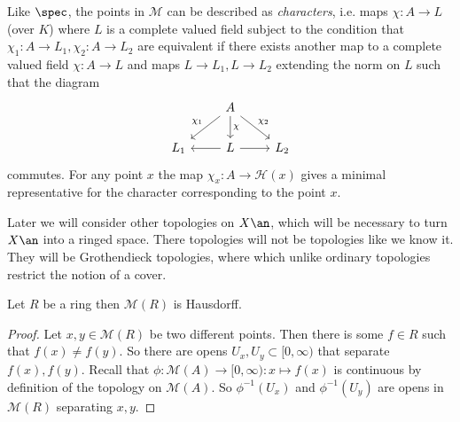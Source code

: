 Like $\spec$, the points in $\mathcal{M} $ can be described as \emph{characters}, i.e.  maps $\chi: A \to L$ (over $K$) where $L$ is a complete valued field subject to the condition that $\chi_1: A \to L_1, \chi_2: A \to L_2$ are equivalent if there exists another map to a complete valued field $\chi: A \to L$  and maps $L \to L_1, L \to L_2$ extending the norm on $L$ such that the diagram 
\[
\begin{tikzcd}
	& A \ar{dl}[']{\chi_1} \ar{dr}{\chi_2} \dar{\chi} \\
	L_1 & L \lar \rar & L_2
\end{tikzcd}
\] 
commutes. 
For any point $x$ the map $\chi_x: A \to \mathcal{H} (x)$ gives a minimal representative for the character corresponding to the point $x$. 


\begin{remark}
	Later we will consider other topologies on $X\an$, which will be necessary to turn $X\an $ into a ringed space. 
	There topologies will not be topologies like we know it. They will be Grothendieck topologies, where which unlike ordinary topologies restrict the notion of a cover. 
\end{remark}

\begin{proposition}\label{prop:spec_ring_haussdorf}
	Let $R$ be a ring then $\mathcal{M} (R)$ is Hausdorff. 
\end{proposition}
\begin{proof}
	Let $x, y \in \mathcal{M} (R)$ be two different points. 
	Then there is some $f \in R$ such that $f(x) \ne f(y)$. 
	So there are opens $U_x, U_y \subset  [0, \infty)$ that separate $f(x), f(y)$.
	Recall that $\phi: \mathcal{M} (A) \to [0, \infty): x \mapsto f(x)$ is continuous by definition of the topology on $\mathcal{M} (A)$. 
	So $\phi^{-1}(U_x)$ and $\phi^{-1}(U_y)$ are opens in $\mathcal{M} (R)$ separating $x,y$. 
\end{proof}


